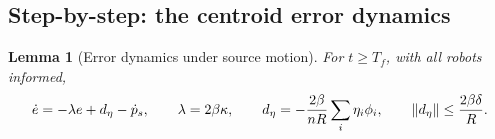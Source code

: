 \documentclass[11pt,a4paper]{article}
\theoremstyle{plain}
\newtheorem{lemma}{Lemma}
\theoremstyle{definition}
\DeclarePairedDelimiter{\norm}{\lVert}{\rVert}
\begin{document}
\subsection{Step-by-step: the centroid error dynamics}\label{sec:gap2-dynamics}

\begin{lemma}[Error dynamics under source motion]\label{lem:moving-error-dynamics}
For $t\geq T_f$, with all robots informed,
\begin{equation}\label{eq:moving-error-dynamics}
    \dot e=-\lambda e+d_\eta-\dot p_s,
    \qquad
    \lambda=2\beta\kappa,
    \qquad
    d_\eta=-\frac{2\beta}{nR}\sum_i\eta_i\phi_i,
    \qquad
    \norm{d_\eta}\leq\frac{2\beta\delta}{R}.
\end{equation}
\end{lemma}
\end{document}
